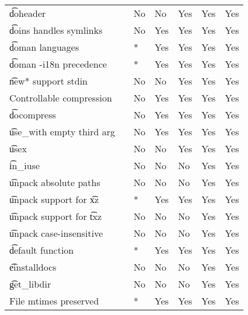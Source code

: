 \begin{landscape}
\begin{longtable}{llP{7.5em}P{7.5em}P{7.5em}P{7.5em}P{7.5em}}
\t{doheader} &  &
    No & No & Yes & Yes & Yes \\

\t{doins} handles symlinks &  &
    No & Yes & Yes & Yes & Yes \\

\t{doman} languages &  &
    * & Yes & Yes & Yes & Yes \\

\t{doman -i18n} precedence &  &
    * & Yes & Yes & Yes & Yes \\

\t{new*} support stdin &  &
    No & No & Yes & Yes & Yes \\

Controllable compression &  &
    No & Yes & Yes & Yes & Yes \\

\t{docompress} &  &
    No & Yes & Yes & Yes & Yes \\

\t{use_with} empty third arg &  &
    No & Yes & Yes & Yes & Yes \\

\t{usex} &  &
    No & No & Yes & Yes & Yes \\

\t{in_iuse} &  &
    No & No & No & Yes & Yes \\

\t{unpack} absolute paths &  &
    No & No & No & Yes & Yes \\

\t{unpack} support for \t{xz} &  &
    * & Yes & Yes & Yes & Yes \\

\t{unpack} support for \t{txz} &  &
    No & No & No & Yes & Yes \\

\t{unpack} case-insensitive &  &
    No & No & No & Yes & Yes \\

\t{default} function &  &
    * & Yes & Yes & Yes & Yes \\

\t{einstalldocs} &  &
    No & No & No & Yes & Yes \\

\t{get_libdir} &  &
    No & No & No & Yes & Yes \\

File mtimes preserved &  &
    * & Yes & Yes & Yes & Yes \\

\end{longtable}
\end{landscape}

